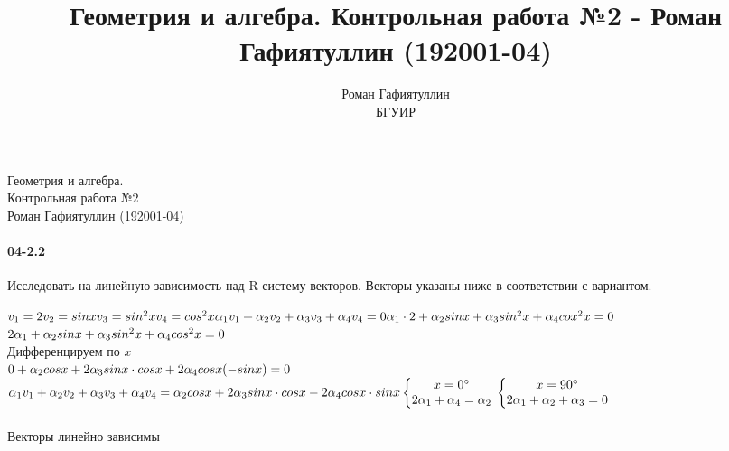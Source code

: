 \documentclass[12pt]{article}
\title{Геометрия и алгебра. Контрольная работа №2 - Роман Гафиятуллин (192001-04)}
\author{Роман Гафиятуллин\\ БГУИР}
\begin{document}
	\begin{titlepage}
		\begin{center}
			{\Large Геометрия и алгебра. \\ Контрольная работа №2 \\ Роман Гафиятуллин (192001-04)}
		\end{center}
	\end{titlepage}
	\clearpage
	\paragraph{04-2.2} Исследовать на линейную зависимость над R систему векторов. Векторы указаны ниже в соответствии с вариантом.

	\ensuremath{
		\\
		v_{1} = 2 \\
		v_{2} = sin x \\
		v_{3} = sin ^2 x \\
		v_{4} = cos ^2 x \\
		\\
		\alpha_{1} v_{1} + \alpha_{2} v_{2} + \alpha_{3} v_{3} + \alpha_{4} v_{4} = 0 \\
		\alpha_{1} \cdot 2 + \alpha_{2} sin x + \alpha_{3} sin ^2 x + \alpha_{4} cox ^2 x = 0 \\
		\\
	}
	\ensuremath{
		2 \alpha_{1} + \alpha_{2} sin x + \alpha_{3} sin ^2 x + \alpha_{4} cos ^2 x = 0 \\
	}
	\\
	Дифференцируем по \ensuremath{x} \\
	\ensuremath{
		0 + \alpha_{2} cos x + 2\alpha_{3} sin x \cdot cos x + 2 \alpha_{4} cos x (-sin x) = 0 \\
	}
	\ensuremath{
		\\
		\alpha_{1} v_{1} + \alpha_{2} v_{2} + \alpha_{3} v_{3} + \alpha_{4} v_{4} = \alpha_{2} cos x + 2\alpha_{3} sin x \cdot cos x - 2 \alpha_{4} cos x \cdot sin x
		\\
		\\
		\left\{\begin{matrix}
		x = 0 ^{\circ} \\
		2 \alpha_{1} + \alpha_{4} = \alpha_{2}
		\end{matrix}\right.
		\\
		\left\{\begin{matrix}
		x = 90 ^{\circ} \\
		2 \alpha_{1} + \alpha_{2} + \alpha_{3} = 0
		\end{matrix}\right.
	}
	\\
	\\
	Векторы линейно зависимы
\end{document}
